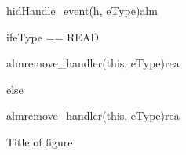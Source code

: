 \documentclass[Main]{subfiles}
\begin{document}
\newpage
\begin{figure}
\begin {sequencediagram}

	\begin{messcall}{hid}{Handle\_event(h, eType)}{alm}

		\begin{sdblock}{if}{eType == READ}

			\begin{messcall}{alm}{remove\_handler(this, eType)}{rea}
			\end{messcall}
		\end{sdblock}

		\begin{sdblock}{else}{}
			\begin{messcall}{alm}{remove\_handler(this, eType)}{rea}
			\end{messcall}
		\end{sdblock}

	\end{messcall}



\end{sequencediagram}

\caption{Title of figure}
\label{fig:alarmEventHandler}
\end{figure}
\end{document}
